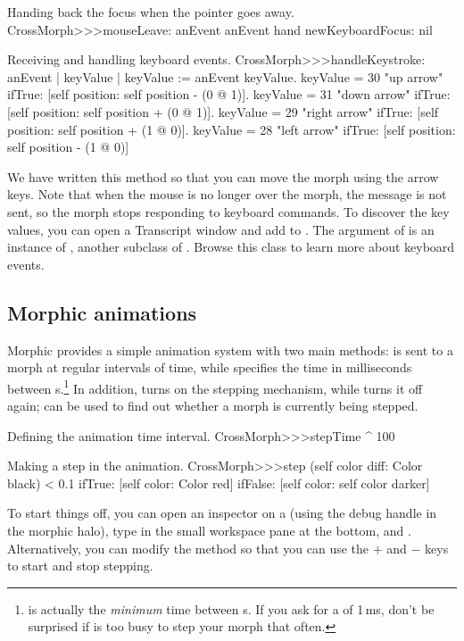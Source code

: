 \documentclass[a4paper,10pt,twoside]{book}
\begin{document}
\begin{method}{Handing back the focus when the pointer goes away.}
CrossMorph>>>mouseLeave: anEvent
	anEvent hand newKeyboardFocus: nil
\end{method}

\begin{method}[handleKeystroke]{Receiving and handling keyboard events.}
CrossMorph>>>handleKeystroke: anEvent
	| keyValue |
	keyValue := anEvent keyValue.
	keyValue = 30	 "up arrow"
		ifTrue: [self position: self position - (0 @ 1)].
	keyValue = 31	 "down arrow"
		ifTrue: [self position: self position + (0 @ 1)].
	keyValue = 29	 "right arrow"
		ifTrue: [self position: self position + (1 @ 0)].
	keyValue = 28	 "left arrow"
		ifTrue: [self position: self position - (1 @ 0)]
\end{method}

We have written this method so that you can move the morph using the arrow keys.
Note that when the mouse is no longer over the morph, the  message is not sent, so the morph stops responding to keyboard commands.
To discover the key values, you can open a Transcript window and add   to .
The  argument of  is an instance of , another subclass of . Browse this class to learn more about keyboard events.

\subsection{Morphic animations}

Morphic provides a simple animation system with two main methods:  is sent to a morph at regular intervals of time, while  specifies the time in milliseconds between s.\footnote{ is actually the \emph{minimum} time between s.   If you ask for a  of 1\,ms, don't be surprised if \sq is too busy to step your morph that often.}
In addition, 
 turns on the stepping mechanism, while  turns it off again;   can be used to find out whether a morph is currently being stepped.

\begin{method}{Defining the animation time interval.}
CrossMorph>>>stepTime
	^ 100
\end{method}
\begin{method}{Making a step in the animation.}
CrossMorph>>>step
	(self color diff: Color black) < 0.1
		ifTrue: [self color: Color red]
		ifFalse: [self color: self color darker]
\end{method}
\noindent
To start things off, you can open an inspector on a  (using the debug handle \debugHandle{} in the morphic halo), type  in the small workspace pane at the bottom, and  .
Alternatively, you can modify the  method so that you can use the $+$ and $-$ keys to start and stop stepping. 
\end{document}
